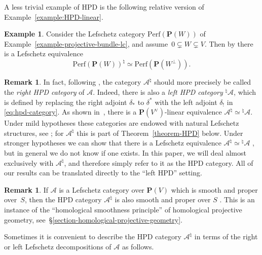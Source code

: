 \documentclass[11pt, reqno]{amsart}
\numberwithin{equation}{section}
\theoremstyle{plain}
\theoremstyle{definition}
\newtheorem{example}[theorem]{Example}
\newtheorem{remark}[theorem]{Remark}
\newcommand{\Perf}{\mathrm{Perf}}
\newcommand{\hpd}{{\natural}}
\newcommand{\svee}{\scriptscriptstyle\vee}
\newcommand{\cAd}{\cA^\hpd}
\newcommand{\dcA}{{^\hpd}\cA}
\newcommand{\vV}{V^{\svee}}
\newcommand{\cA}{\mathcal{A}}
\newcommand{\bP}{\mathbf{P}}
\begin{document}
A less trivial example of HPD is the following relative version of Example~\ref{example:HPD-linear}.

\begin{example}
\label{ex:categorical-linear-hpd}
Consider the Lefschetz category $\Perf(\bP(W))$ of Example~\ref{example-projective-bundle-lc}, 
and assume~$0 \subsetneq W \subsetneq V$.
Then by \cite[Corollary~8.3]{kuznetsov-hpd} 
there is a Lefschetz equivalence
\begin{equation*}
\Perf(\bP(W))^\hpd \simeq \Perf(\bP(W^\perp)).
\end{equation*}
\end{example}


\begin{remark}
\label{remark-left-HPD} 
In fact, following \cite[\S7.1]{NCHPD}, the category $\cAd$ should more precisely be 
called the \emph{right HPD category} of $\cA$. 
Indeed, there is also a \emph{left HPD category} $\dcA$, which is defined 
by replacing the right adjoint $\delta_*$ to $\delta^*$ with the left adjoint 
$\delta_!$ in \eqref{eq:hpd-category}. 
As shown in~\cite[Lemma~7.2]{NCHPD}, there is a $\bP(\vV)$-linear 
equivalence $\cAd \simeq \dcA$. 
Under mild hypotheses these categories are endowed with natural Lefschetz 
structures, see \cite[\S7.2]{NCHPD}; 
for $\cAd$ this is part of Theorem~\ref{theorem-HPD} below. 
Under stronger hypotheses we can show that there is 
a Lefschetz equivalence $\cAd \simeq \dcA$ \cite[Proposition 7.12]{NCHPD}, 
but in general we do not know if one exists. 
In this paper, we will deal almost exclusively with $\cAd$, and 
therefore simply refer to it as the HPD category. 
All of our results can be translated directly to the ``left HPD'' setting. 
\end{remark}

\begin{remark}
\label{remark-HPD-smooth-proper}
If $\cA$ is a Lefschetz category over $\bP(V)$ which is smooth and proper over~$S$, 
then the HPD category $\cAd$ is also smooth and proper over $S$ \cite[Lemma 7.18]{NCHPD}. 
This is an instance of the ``homological smoothness principle'' of homological projective geometry, 
see~\S\ref{section-homological-projective-geometry}.
\end{remark}

Sometimes it is convenient to describe the HPD category 
$\cA^{\hpd}$ in terms of the right or left Lefschetz decompositions of $\cA$ as follows.
\end{document}
